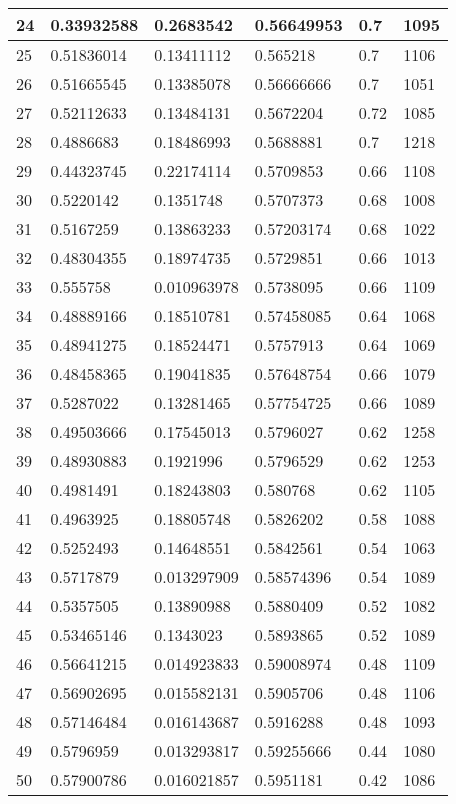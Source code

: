 \begin{longtable}{|l|l|l|l|l|l|}
24 & 0.33932588 & 0.2683542 & 0.56649953 & 0.7 & 1095 \\ \hline 
25 & 0.51836014 & 0.13411112 & 0.565218 & 0.7 & 1106 \\ \hline 
26 & 0.51665545 & 0.13385078 & 0.56666666 & 0.7 & 1051 \\ \hline 
27 & 0.52112633 & 0.13484131 & 0.5672204 & 0.72 & 1085 \\ \hline 
28 & 0.4886683 & 0.18486993 & 0.5688881 & 0.7 & 1218 \\ \hline 
29 & 0.44323745 & 0.22174114 & 0.5709853 & 0.66 & 1108 \\ \hline 
30 & 0.5220142 & 0.1351748 & 0.5707373 & 0.68 & 1008 \\ \hline 
31 & 0.5167259 & 0.13863233 & 0.57203174 & 0.68 & 1022 \\ \hline 
32 & 0.48304355 & 0.18974735 & 0.5729851 & 0.66 & 1013 \\ \hline 
33 & 0.555758 & 0.010963978 & 0.5738095 & 0.66 & 1109 \\ \hline 
34 & 0.48889166 & 0.18510781 & 0.57458085 & 0.64 & 1068 \\ \hline 
35 & 0.48941275 & 0.18524471 & 0.5757913 & 0.64 & 1069 \\ \hline 
36 & 0.48458365 & 0.19041835 & 0.57648754 & 0.66 & 1079 \\ \hline 
37 & 0.5287022 & 0.13281465 & 0.57754725 & 0.66 & 1089 \\ \hline 
38 & 0.49503666 & 0.17545013 & 0.5796027 & 0.62 & 1258 \\ \hline 
39 & 0.48930883 & 0.1921996 & 0.5796529 & 0.62 & 1253 \\ \hline 
40 & 0.4981491 & 0.18243803 & 0.580768 & 0.62 & 1105 \\ \hline 
41 & 0.4963925 & 0.18805748 & 0.5826202 & 0.58 & 1088 \\ \hline 
42 & 0.5252493 & 0.14648551 & 0.5842561 & 0.54 & 1063 \\ \hline 
43 & 0.5717879 & 0.013297909 & 0.58574396 & 0.54 & 1089 \\ \hline 
44 & 0.5357505 & 0.13890988 & 0.5880409 & 0.52 & 1082 \\ \hline 
45 & 0.53465146 & 0.1343023 & 0.5893865 & 0.52 & 1089 \\ \hline 
46 & 0.56641215 & 0.014923833 & 0.59008974 & 0.48 & 1109 \\ \hline 
47 & 0.56902695 & 0.015582131 & 0.5905706 & 0.48 & 1106 \\ \hline 
48 & 0.57146484 & 0.016143687 & 0.5916288 & 0.48 & 1093 \\ \hline 
49 & 0.5796959 & 0.013293817 & 0.59255666 & 0.44 & 1080 \\ \hline 
50 & 0.57900786 & 0.016021857 & 0.5951181 & 0.42 & 1086 \\ \hline 
\end{longtable}